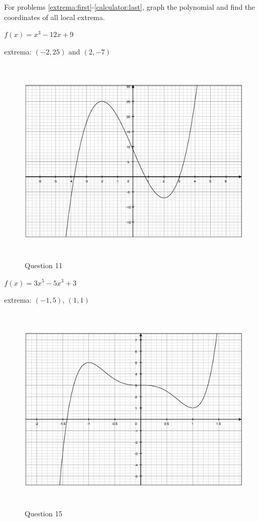 \documentclass[fleqn,addpoints]{exam}
\begin{document}
\begin{questions}
For problems \ref{extrema:first}-\ref{calculator:last}, graph the polynomial and find the coordinates of all local
extrema.

\question \label{extrema:first} $f(x) = x^3 - 12x + 9$
\begin{solution}
extrema: $(-2, 25)$ and $(2, -7)$
\begin{figure}[H]
  \centering
  \includegraphics[width=14cm,height=10cm]{question_11.eps}
  \caption*{Question 11}
\end{figure}

\end{solution}

\ifprintanswers
\pagebreak
\else
\fi

\question  $f(x) = 3x^5-5x^3+3$

\begin{solution}
extrema: $(-1, 5)$, $(1, 1)$
\begin{figure}[H]
  \centering
  \includegraphics[width=14cm,height=10cm]{question_15.eps}
  \caption*{Question 15}
\end{figure}


\end{solution}
\end{questions}
\end{document}
